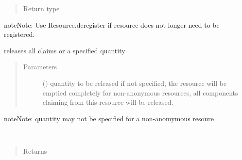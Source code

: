 \documentclass[letterpaper,10pt,english]{sphinxmanual}
\begin{document}
\begin{fulllineitems}
\begin{fulllineitems}
\begin{quote}
\begin{description}
\item[{Return type}] \leavevmode
{\hyperref[\detokenize{Reference:salabim.Resource}]{}}

\end{description}\end{quote}

\begin{sphinxadmonition}{note}{Note:}
Use Resource.deregister if resource does not longer need to be registered.
\end{sphinxadmonition}

\end{fulllineitems}


\begin{fulllineitems}
\label{\detokenize{Reference:salabim.Resource.release}}
releases all claims or a specified quantity
\begin{quote}\begin{description}
\item[{Parameters}] \leavevmode
{} () \textendash{} quantity to be released 
if not specified, the resource will be emptied completely 
for non-anonymous resources, all components claiming from this resource
will be released.

\end{description}\end{quote}

\begin{sphinxadmonition}{note}{Note:}
quantity may not be specified for a non-anomymous resoure
\end{sphinxadmonition}

\end{fulllineitems}


\begin{fulllineitems}
\label{\detokenize{Reference:salabim.Resource.requesters}}~\begin{quote}\begin{description}
\item[{Returns}] \leavevmode
{}


\end{description}
\end{quote}
\end{fulllineitems}
\end{fulllineitems}
\end{document}
